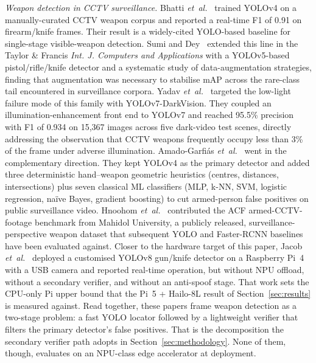 \documentclass{ieeeaccess}
\begin{document}
\emph{Weapon detection in CCTV surveillance.} Bhatti \emph{et~al.}~\cite{b18} trained YOLOv4 on a manually-curated CCTV weapon corpus and reported a real-time F1 of 0.91 on firearm/knife frames. Their result is a widely-cited YOLO-based baseline for single-stage visible-weapon detection. Sumi and Dey~\cite{b30} extended this line in the Taylor \& Francis \emph{Int. J. Computers and Applications} with a YOLOv5-based pistol/rifle/knife detector and a systematic study of data-augmentation strategies, finding that augmentation was necessary to stabilise mAP across the rare-class tail encountered in surveillance corpora. Yadav \emph{et~al.}~\cite{b19} targeted the low-light failure mode of this family with YOLOv7-DarkVision. They coupled an illumination-enhancement front end to YOLOv7 and reached 95.5\% precision with F1 of 0.934 on 15{,}367 images across five dark-video test scenes, directly addressing the observation that CCTV weapons frequently occupy less than 3\% of the frame under adverse illumination. Amado-Garfi\'{a}s \emph{et~al.}~\cite{b20} went in the complementary direction. They kept YOLOv4 as the primary detector and added three deterministic hand--weapon geometric heuristics (centres, distances, intersections) plus seven classical ML classifiers (MLP, k-NN, SVM, logistic regression, na\"ive Bayes, gradient boosting) to cut armed-person false positives on public surveillance video. Hnoohom \emph{et~al.}~\cite{b32} contributed the ACF armed-CCTV-footage benchmark from Mahidol University, a publicly released, surveillance-perspective weapon dataset that subsequent YOLO and Faster-RCNN baselines have been evaluated against. Closer to the hardware target of this paper, Jacob \emph{et~al.}~\cite{b28} deployed a customised YOLOv8 gun/knife detector on a Raspberry Pi~4 with a USB camera and reported real-time operation, but without NPU offload, without a secondary verifier, and without an anti-spoof stage. That work sets the CPU-only Pi upper bound that the Pi~5 + Hailo-8L result of Section~\ref{sec:results} is measured against. Read together, these papers frame weapon detection as a two-stage problem: a fast YOLO locator followed by a lightweight verifier that filters the primary detector's false positives. That is the decomposition the secondary verifier path adopts in Section~\ref{sec:methodology}. None of them, though, evaluates on an NPU-class edge accelerator at deployment.
\end{document}

